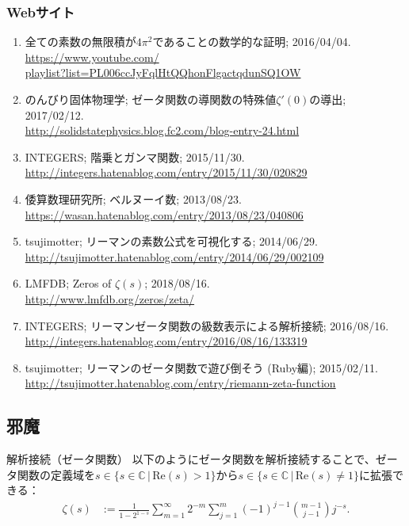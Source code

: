 \documentclass[11pt,b5paper,papersize,dvipdfmx]{jsbook}
\begin{document}
\subsubsection*{Webサイト}
\begin{enumerate}
  \item 全ての素数の無限積が$4\pi^2$であることの数学的な証明; 2016/04/04.\\
    \url{https://www.youtube.com/}\\ \quad\url{playlist?list=PL006ccJyFqlHtQQhonFlgactqdunSQ1OW}
  \item のんびり固体物理学; ゼータ関数の導関数の特殊値$\zeta'(0)$の導出; 2017/02/12.\\
    \url{http://solidstatephysics.blog.fc2.com/blog-entry-24.html}
  \item INTEGERS; 階乗とガンマ関数; 2015/11/30. \\
    \url{http://integers.hatenablog.com/entry/2015/11/30/020829}
  \item 倭算数理研究所; ベルヌーイ数; 2013/08/23. \\
    \url{https://wasan.hatenablog.com/entry/2013/08/23/040806}
  \item tsujimotter; リーマンの素数公式を可視化する; 2014/06/29.\\
    \url{http://tsujimotter.hatenablog.com/entry/2014/06/29/002109}
  \item LMFDB; Zeros of $\zeta(s)$; 2018/08/16.\\
    \url{http://www.lmfdb.org/zeros/zeta/}
  \item INTEGERS; リーマンゼータ関数の級数表示による解析接続; 2016/08/16.\\
    \url{http://integers.hatenablog.com/entry/2016/08/16/133319}
  \item tsujimotter; リーマンのゼータ関数で遊び倒そう (Ruby編); 2015/02/11.\\
    \url{http://tsujimotter.hatenablog.com/entry/riemann-zeta-function}
\end{enumerate}





%
\subsection{邪魔}

\begin{thm}{解析接続（ゼータ関数）}
  以下のようにゼータ関数を解析接続することで、ゼータ関数の定義域を$s \in \{ s \in \mathbb{C} \,|\, \mathrm{Re}(s) > 1 \} $から$s \in \{ s \in \mathbb{C} \,|\, \mathrm{Re}(s) \ne 1 \}$に拡張できる：
  \begin{align}
    \zeta(s) &:= \frac{1}{1 - 2^{1-s}} \sum_{m=1}^\infty 2^{-m} \sum_{j=1}^m (-1)^{j-1} \binom{m-1}{j-1}j^{-s}.
  \end{align}
\end{thm}
\end{document}
